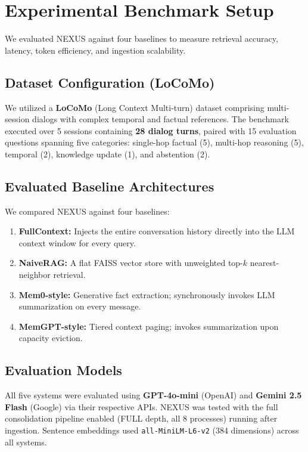 \documentclass[conference]{IEEEtran}
\begin{document}
\section{Experimental Benchmark Setup}

We evaluated NEXUS against four baselines to measure retrieval accuracy, latency, token efficiency, and ingestion scalability.

\subsection{Dataset Configuration (LoCoMo)}
We utilized a \textbf{LoCoMo} (Long Context Multi-turn) dataset \cite{locomo} comprising multi-session dialogs with complex temporal and factual references. The benchmark executed over 5 sessions containing \textbf{28 dialog turns}, paired with 15 evaluation questions spanning five categories: single-hop factual (5), multi-hop reasoning (5), temporal (2), knowledge update (1), and abstention (2).

\subsection{Evaluated Baseline Architectures}
We compared NEXUS against four baselines:
\begin{enumerate}
    \item \textbf{FullContext:} Injects the entire conversation history directly into the LLM context window for every query.
    \item \textbf{NaiveRAG:} A flat FAISS vector store with unweighted top-$k$ nearest-neighbor retrieval.
    \item \textbf{Mem0-style:} Generative fact extraction; synchronously invokes LLM summarization on every message.
    \item \textbf{MemGPT-style:} Tiered context paging; invokes summarization upon capacity eviction.  
\end{enumerate}

\subsection{Evaluation Models}
All five systems were evaluated using \textbf{GPT-4o-mini} (OpenAI) and \textbf{Gemini 2.5 Flash} (Google) via their respective APIs. NEXUS was tested with the full consolidation pipeline enabled (FULL depth, all 8 processes) running after ingestion. Sentence embeddings used \texttt{all-MiniLM-L6-v2} (384 dimensions) across all systems.
\end{document}
